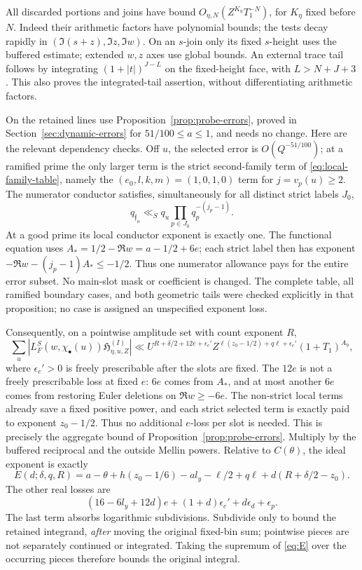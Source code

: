 \documentclass[12pt]{article}
\begin{document}
All discarded portions and joins have bound
\(O_{\eta,N}(Z^{K_\eta}T_1^{-N})\), for \(K_\eta\) fixed before
\(N\).  Indeed their arithmetic factors have polynomial bounds;
the tests decay rapidly in
\((\Im(s+z),\Im z,\Im w)\).
On an \(s\)-join only its fixed \(s\)-height uses the buffered
estimate; extended \(w,z\) axes use global bounds.
An external trace tail follows by integrating
\((1+|t|)^{J-L}\) on the fixed-height face, with \(L>N+J+3\).
This also proves the integrated-tail assertion, without
differentiating arithmetic factors.

On the retained lines use Proposition~\ref{prop:probe-errors},
proved in Section~\ref{sec:dynamic-errors} for
\(51/100\le a\le1\), and needs no change.
Here are the relevant dependency checks.  Off \(u\), the selected
error is \(O(Q^{-51/100})\); at a ramified prime the only larger
term is the strict second-family term of \eqref{eq:local-family-table},
namely the \((e_0,l,k,m)=(1,0,1,0)\) term for \(j=v_p(u)\ge2\).
The numerator conductor satisfies, simultaneously for all distinct
strict labels \(J_0\),
\[
 q_{\mathfrak f_u}\ll_Sq_u
                  \prod_{p\in J_0}q_p^{-(j_p-1)} .
\]
At a good prime its local conductor exponent is exactly one.
The functional equation uses \(A_*=1/2-\Re w=a-1/2+6e\);
each strict label then has exponent
\(-\Re w-(j_p-1)A_*\le-1/2\).
Thus one numerator allowance pays for the entire error subset.
No main-slot mask or coefficient is changed.  The complete table, all ramified boundary cases, and both geometric
tails were checked explicitly in that proposition; no case is
assigned an unspecified exponent loss.

Consequently, on a pointwise amplitude set with count exponent \(R\),
\[
 \sum_u|L_F^S(w,\chi_\bullet(u))\mathfrak H_{\eta,u,Z}^{(I)}|
 \ll U^{R+\delta/2+12e+\epsilon_c'}
 Z^{\ell(z_0-1/2)+q\ell+\epsilon_c'}(1+T_1)^{A_\eta},
\]
where \(\epsilon_c'>0\) is freely prescribable after the slots
are fixed.  The \(12e\) is not a freely prescribable loss at fixed
\(e\): \(6e\) comes from \(A_*\), and at most another \(6e\)
comes from restoring Euler deletions on \(\Re w\ge-6e\).
The non-strict local terms already save a fixed positive power,
and each strict selected term is exactly paid to exponent
\(z_0-1/2\).  Thus no additional \(e\)-loss per slot is needed.
This is precisely the aggregate bound of Proposition~\ref{prop:probe-errors}.  Multiply by the buffered reciprocal and the
outside Mellin powers.  Relative to \(C(\theta)\), the
ideal exponent is exactly
\begin{equation}\label{eq:E}
 E(d;\delta,q,R)=a-\theta+
 h(z_0-1/6)-a l_y-\ell/2+q\ell
                       +d(R+\delta/2-z_0).
\end{equation}
The other real losses are
\[
 (16-6l_y+12d)e+(1+d)\epsilon_c'
                          +d\epsilon_d+\epsilon_p.
\]
The last term absorbs logarithmic subdivisions.
Subdivide only to bound the retained integrand, \emph{after}
moving the original fixed-bin sum; pointwise pieces are not
separately continued or integrated.
Taking the supremum of \eqref{eq:E} over the occurring pieces
therefore bounds the original integral.
\end{document}
